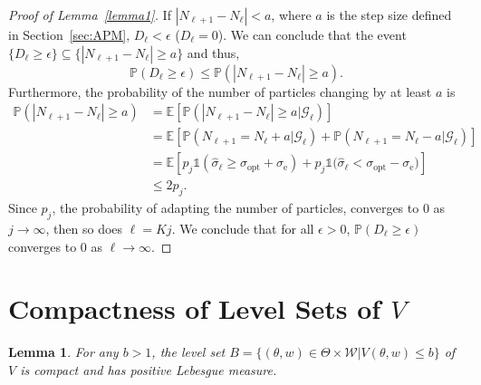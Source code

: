 \documentclass[pdflatex,sn-mathphys-num]{sn-jnl}
\newcommand{\Prob}{\mathbb{P}}
\newcommand{\E}{\mathbb{E}}
\newcommand{\ind}{\mathds{1}}
\renewcommand{\geq}{\geqslant}
\renewcommand{\leq}{\leqslant}
\theoremstyle{thmstyleone}
\newtheorem{lemma}{Lemma}
\theoremstyle{thmstyletwo}
\theoremstyle{thmstylethree}
\begin{document}
\begin{proof}[Proof of Lemma~{\upshape\ref{lemma1}}]
If \(|N_{\ell+1}-N_\ell| <a\), where $a$ is the step size defined in Section~\ref{sec:APM}, $D_\ell < \epsilon$ ($D_\ell=0$). We can conclude that the event $\{D_\ell \geq \epsilon\} \subseteq \{|N_{\ell+1}-N_\ell| \geq a\}$ and thus, 
$$\Prob(D_\ell \geq \epsilon) \leq \Prob(|N_{\ell+1}-N_\ell| \geq a).$$
Furthermore, the probability of the number of particles changing by at least $a$ is
\begin{align*}
    \Prob(|N_{\ell+1}-N_{\ell}| \geq a) &= \E[\Prob(|N_{\ell+1}-N_{\ell}| \geq a|\mathcal{G}_\ell)]\\
    &= \E[\Prob(N_{\ell+1}=N_\ell+a|\mathcal{G}_\ell) + \Prob(N_{\ell+1}=N_\ell-a|\mathcal{G}_\ell)]\\
    &= \E\left[p_j \ind{(\hat{\sigma}_\ell \geq {\sigma}_{\text{opt}}+\sigma_\text{e})} + p_j \ind{(\hat{\sigma}_\ell < {\sigma}_{\text{opt}}-\sigma_\text{e}})\right]\\
    &\leq 2p_j.
\end{align*}
Since $p_j$, the probability of adapting the number of particles, converges to $0$ as $j \rightarrow \infty$, then so does $\ell=Kj$. We conclude that for all $\epsilon >0$, $\Prob(D_\ell \geq \epsilon)$ converges to $0$ as $\ell \rightarrow \infty$. 
\end{proof}

\section{Compactness of Level Sets of $V$}
\label{appendixC}
\begin{lemma}
For any $b > 1$, the level set 
\(B = \{(\theta, w) \in \Theta \times \mathcal{W} | V(\theta, w) \leq b\} \) of $V$
is compact and has positive Lebesgue measure.
\label{lemma2}
\end{lemma}
\end{document}
